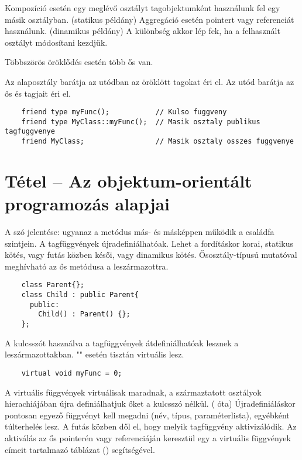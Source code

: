 \documentclass[main.tex]{subfiles}
\begin{document}
  Kompozíció esetén egy meglévő osztályt
  tagobjektumként használunk
  fel egy másik osztályban. (statikus példány)
  Aggregáció esetén pointert vagy referenciát
  használunk. (dinamikus példány)
  A különbség akkor lép fek, ha a felhasznált
  osztályt módosítani kezdjük.


  Többszörös öröklődés esetén több ős van.


  Az alaposztály barátja az utódban az öröklött tagokat éri el.
  Az utód barátja az ős  és  tagjait éri el.
  \begin{lstlisting}
    friend type myFunc();           // Kulso fuggveny
    friend type MyClass::myFunc();  // Masik osztaly publikus tagfuggvenye
    friend MyClass;                 // Masik osztaly osszes fuggvenye
  \end{lstlisting}



  \section{Tétel – Az objektum-orientált programozás alapjai} %

  A szó jelentése: ugyanaz a metódus más-
  és másképpen működik a családfa szintjein.
  A tagfüggvények újradefiniálhatóak.
  Lehet a fordításkor korai, statikus kötés,
  vagy futás közben késői, vagy dinamikus kötés.
  Ősosztály-típusú mutatóval meghívható az ős metódusa a leszármazottra.
  \begin{lstlisting}
    class Parent{};
    class Child : public Parent{
      public:
        Child() : Parent() {};
    };
  \end{lstlisting}

  A  kulcsszót használva a tagfüggvények
  átdefiniálhatóak lesznek a leszármazottakban.
  "" esetén tisztán virtuális lesz.
  \begin{lstlisting}
    virtual void myFunc = 0;
  \end{lstlisting}
  A virtuális függvények virtuálisak maradnak,
  a származtatott osztályok hierachiájában újra definiálhatjuk
  őket a  kulcsszó nélkül. ( óta)
  Újradefiniáláskor pontosan egyező függvényt kell megadni
  (név, típus, paraméterlista), egyébként túlterhelés lesz.
  A futás közben dől el, hogy melyik tagfüggvény aktivizálódik.
  Az aktiválás az ős pointerén vagy referenciáján keresztül
  egy a virtuális függvények címeit tartalmazó
  táblázat () segítségével.
\end{document}
